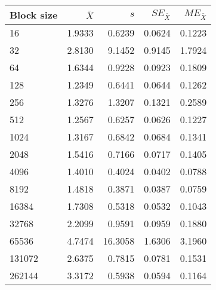 \begin{tabular}{lrrrr}\toprule
{\small Block size} & $\bar{X}$ & $s$ & $SE_{\bar{X}}$ & $ME_{\bar{X}}$ \\\midrule
16 & 1.9333 & 0.6239 & 0.0624 & 0.1223\\
32 & 2.8130 & 9.1452 & 0.9145 & 1.7924\\
64 & 1.6344 & 0.9228 & 0.0923 & 0.1809\\
128 & 1.2349 & 0.6441 & 0.0644 & 0.1262\\
256 & 1.3276 & 1.3207 & 0.1321 & 0.2589\\
512 & 1.2567 & 0.6257 & 0.0626 & 0.1227\\
1024 & 1.3167 & 0.6842 & 0.0684 & 0.1341\\
2048 & 1.5416 & 0.7166 & 0.0717 & 0.1405\\
4096 & 1.4010 & 0.4024 & 0.0402 & 0.0788\\
8192 & 1.4818 & 0.3871 & 0.0387 & 0.0759\\
16384 & 1.7308 & 0.5318 & 0.0532 & 0.1043\\
32768 & 2.2099 & 0.9591 & 0.0959 & 0.1880\\
65536 & 4.7474 & 16.3058 & 1.6306 & 3.1960\\
131072 & 2.6375 & 0.7815 & 0.0781 & 0.1531\\
262144 & 3.3172 & 0.5938 & 0.0594 & 0.1164\\
\bottomrule
\end{tabular}
